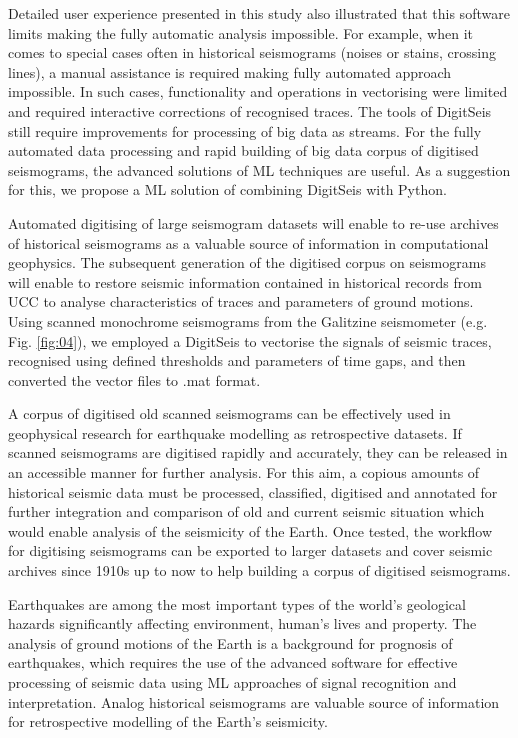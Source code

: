 \documentclass[informatics,article,submit,moreauthors,pdftex]{Definitions/mdpi}
\begin{document}
Detailed user experience presented in this study also illustrated that this software limits making the fully automatic analysis impossible. For example, when it comes to special cases often in historical seismograms (noises or stains, crossing lines), a manual assistance is required making fully automated approach impossible. In such cases, functionality and operations in vectorising were limited and required interactive corrections of recognised traces. The tools of DigitSeis still require improvements for processing of big data as streams. For the fully automated data processing and rapid building of big data corpus of digitised seismograms, the advanced solutions of \ac{ML} techniques are useful. As a suggestion for this, we propose a \ac{ML} solution of combining DigitSeis with Python. 

Automated digitising of large seismogram datasets will enable to re-use archives of historical seismograms as a valuable source of information in computational geophysics. The subsequent generation of the digitised corpus on seismograms will enable to restore seismic information contained in historical records from \ac{UCC} to analyse characteristics of traces and parameters of ground motions. Using scanned monochrome seismograms from the Galitzine seismometer (e.g. Fig. \ref{fig:04}), we employed a DigitSeis to vectorise the signals of seismic traces, recognised using defined thresholds and parameters of time gaps, and then converted the vector files to .mat format.  

A corpus of digitised old scanned seismograms can be effectively used in geophysical research for earthquake modelling as retrospective datasets. If scanned seismograms are digitised rapidly and accurately, they can be released in an accessible manner for further analysis. For this aim, a copious amounts of historical seismic data must be processed, classified, digitised and annotated for further integration and comparison of old and current seismic situation which would enable analysis of the seismicity of the Earth. Once tested, the workflow for digitising seismograms can be exported to larger datasets and cover seismic archives since 1910s up to now to help building a corpus of digitised seismograms. 

Earthquakes are among the most important types of the world's geological hazards significantly affecting environment, human's lives and property. The analysis of ground motions of the Earth is a background for prognosis of earthquakes, which requires the use of the advanced software for effective processing of seismic data using \ac{ML} approaches of signal recognition and interpretation. Analog historical seismograms are valuable source of information for retrospective modelling of the Earth's seismicity. 
\end{document}
